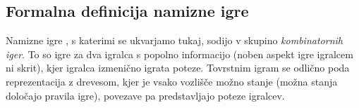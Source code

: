 \documentclass[12pt,a4paper]{amsart}
\theoremstyle{definition} %
\theoremstyle{plain} %
\begin{document}
\subsection{Formalna definicija namizne igre} Namizne igre , s katerimi se ukvarjamo tukaj, sodijo 
v skupino \textit{kombinatornih iger}. To so igre za dva igralca s popolno informacijo (noben aspekt 
igre igralcem ni skrit), kjer igralca izmenično igrata poteze. Tovrstnim igram se odlično poda 
reprezentacija z drevesom, kjer je vsako vozlišče možno stanje (možna stanja določajo pravila igre), 
povezave pa predstavljajo poteze igralcev.
\end{document}
